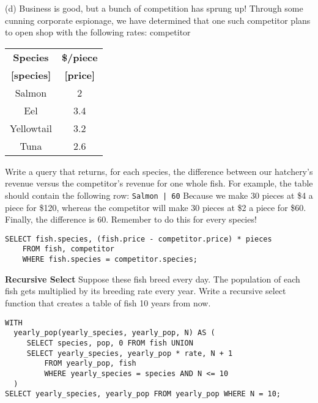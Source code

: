 \documentclass{exam}
\begin{document}
\begin{questions}
\begin{blocksection} 
(d) Business is good, but a bunch of competition has sprung up! Through some cunning corporate espionage, we have determined that one such competitor plans to open shop with the following rates:\newline
\newline
competitor
\begin{center}
\begin{tabular}{ |c|c| } 
 \hline
 \textbf{Species} & \textbf{\$/piece} \\ 
  \textbf{[species]} & \textbf{[price]} \\ 
 \hline
 Salmon & 2 \\ 
 \hline
 Eel & 3.4 \\ 
 \hline
  Yellowtail & 3.2  \\ 
 \hline
 Tuna & 2.6  \\ 
 \hline
\end{tabular}
\end{center}
Write a query that returns, for each species, the difference between our hatchery’s revenue versus the competitor’s revenue for one whole fish. For example, the table should contain the following row: \newline
\texttt{Salmon | 60} \newline \newline
Because we make 30 pieces at \$4 a piece for \$120, whereas the competitor will make 30 pieces at \$2 a piece for \$60. Finally, the difference is 60. Remember to do this for every species!
\begin{solution}[1in]
\begin{lstlisting}
SELECT fish.species, (fish.price - competitor.price) * pieces 
    FROM fish, competitor 
    WHERE fish.species = competitor.species;
\end{lstlisting}
\end{solution}


\end{blocksection}

\question \textbf{Recursive Select} Suppose these fish breed every day. The population of each fish gets multiplied by its breeding rate every year. Write a recursive select function that creates a table of fish 10 years from now.

\begin{solution}[0.5in]
\begin{lstlisting}
WITH 
  yearly_pop(yearly_species, yearly_pop, N) AS (
     SELECT species, pop, 0 FROM fish UNION
     SELECT yearly_species, yearly_pop * rate, N + 1 
         FROM yearly_pop, fish 
         WHERE yearly_species = species AND N <= 10
  )
SELECT yearly_species, yearly_pop FROM yearly_pop WHERE N = 10;

\end{lstlisting}
\end{solution}


\end{questions}

\end{document}
